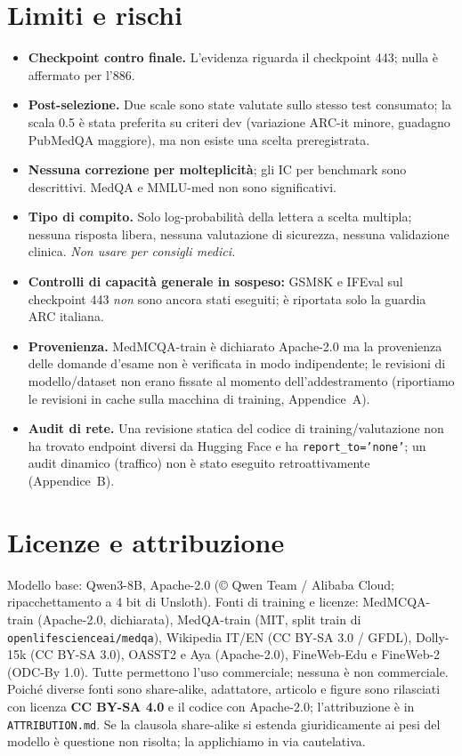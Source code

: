 \documentclass[11pt,a4paper]{article}
\begin{document}
\section{Limiti e rischi}
\begin{itemize}
\item \textbf{Checkpoint contro finale.} L'evidenza riguarda il checkpoint 443; nulla è affermato per l'886.
\item \textbf{Post-selezione.} Due scale sono state valutate sullo stesso test consumato; la scala 0.5 è stata preferita su criteri dev (variazione ARC-it minore, guadagno PubMedQA maggiore), ma non esiste una scelta preregistrata.
\item \textbf{Nessuna correzione per molteplicità}; gli IC per benchmark sono descrittivi. MedQA e MMLU-med non sono significativi.
\item \textbf{Tipo di compito.} Solo log-probabilità della lettera a scelta multipla; nessuna risposta libera, nessuna valutazione di sicurezza, nessuna validazione clinica. \emph{Non usare per consigli medici.}
\item \textbf{Controlli di capacità generale in sospeso:} GSM8K e IFEval sul checkpoint 443 \emph{non} sono ancora stati eseguiti; è riportata solo la guardia ARC italiana.
\item \textbf{Provenienza.} MedMCQA-train è dichiarato Apache-2.0 ma la provenienza delle domande d'esame non è verificata in modo indipendente; le revisioni di modello/dataset non erano fissate al momento dell'addestramento (riportiamo le revisioni in cache sulla macchina di training, Appendice~A).
\item \textbf{Audit di rete.} Una revisione statica del codice di training/valutazione non ha trovato endpoint diversi da Hugging Face e ha \texttt{report\_to='none'}; un audit dinamico (traffico) non è stato eseguito retroattivamente (Appendice~B).
\end{itemize}

\section{Licenze e attribuzione}
Modello base: Qwen3-8B, Apache-2.0 (\copyright{} Qwen Team / Alibaba Cloud; ripacchettamento a 4 bit di Unsloth). Fonti di training e licenze: MedMCQA-train (Apache-2.0, dichiarata), MedQA-train (MIT, split train di \texttt{openlifescienceai/medqa}), Wikipedia IT/EN (CC BY-SA 3.0 / GFDL), Dolly-15k (CC BY-SA 3.0), OASST2 e Aya (Apache-2.0), FineWeb-Edu e FineWeb-2 (ODC-By 1.0). Tutte permettono l'uso commerciale; nessuna è non commerciale. Poiché diverse fonti sono share-alike, adattatore, articolo e figure sono rilasciati con licenza \textbf{CC BY-SA 4.0} e il codice con Apache-2.0; l'attribuzione è in \texttt{ATTRIBUTION.md}. Se la clausola share-alike si estenda giuridicamente ai pesi del modello è questione non risolta; la applichiamo in via cautelativa.
\end{document}
